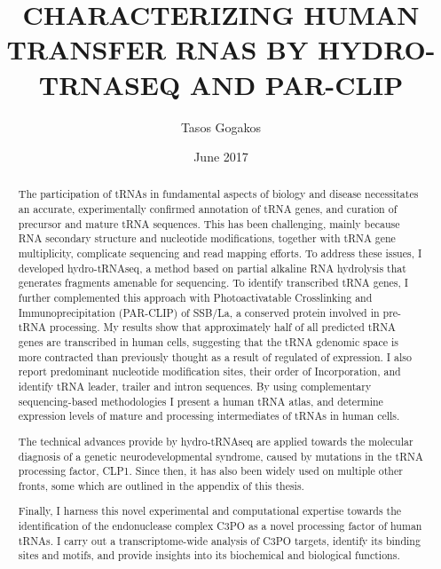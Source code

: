 \documentclass[12pt]{rockefeller}
\begin{document}
\author{Tasos Gogakos}
\title{\MakeUppercase{Characterizing human transfer rnas by hydro-trnaseq and par-clip}}
\date{June 2017}

\maketitle

\thispagestyle{empty}
\makecopyright

\begin{abstract}

The participation of tRNAs in fundamental aspects of biology and disease necessitates an accurate, experimentally confirmed annotation of tRNA genes, and curation of precursor and mature tRNA sequences. This has been challenging, mainly because RNA secondary structure and nucleotide modifications, together with tRNA gene multiplicity, complicate sequencing and read mapping efforts. To address these issues, I developed hydro-tRNAseq, a method based on partial alkaline RNA hydrolysis that generates fragments amenable for sequencing. To identify transcribed tRNA genes, I further complemented this approach with Photoactivatable Crosslinking and Immunoprecipitation (PAR-CLIP) of SSB/La, a conserved protein involved in pre-tRNA processing. My results show that approximately half of all predicted tRNA genes are transcribed in human cells, suggesting that the tRNA gdenomic space is more contracted than previously thought as a result of regulated of expression. I also report predominant nucleotide modification sites, their order of Incorporation, and identify tRNA leader, trailer and intron sequences. By using complementary sequencing-based methodologies I present a human tRNA atlas, and determine expression levels of mature and processing intermediates of tRNAs in human cells.

The technical advances provide by hydro-tRNAseq are applied towards the molecular diagnosis of a genetic neurodevelopmental syndrome, caused by mutations in the tRNA processing factor, CLP1. Since then, it has also been widely used on multiple other fronts, some which are outlined in the appendix of this thesis. 

Finally, I harness this novel experimental and computational expertise towards the identification of the endonuclease complex C3PO as a novel processing factor of human tRNAs. I carry out a transcriptome-wide analysis of C3PO targets, identify its binding sites and motifs, and provide insights into its biochemical and biological functions. 

\end{abstract}
\end{document}
